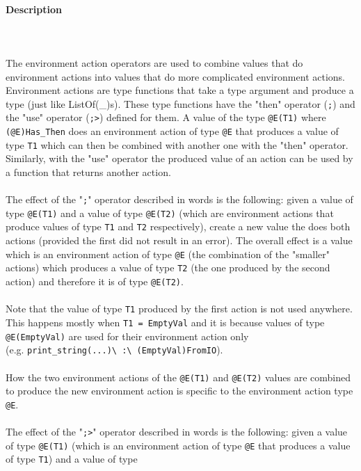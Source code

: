 \documentclass{article}
\begin{document}
\paragraph{Description}
\mbox{} \\\\
The environment action operators are used to combine values that do environment
actions into values that do more complicated environment actions. Environment
actions are type functions that take a type argument and produce a type (just
like ListOf(_)s). These type functions have the "then" operator (\verb|;|)
and the "use" operator (\verb|;>|) defined for them.  A value of the type
\verb|@E(T1)| where \verb|(@E)Has_Then| does an environment action of type
\verb|@E| that produces a value of type \verb|T1| which can then be
combined with another one with the "then" operator. Similarly, with the "use"
operator the produced value of an action can be used by a function that returns
another action.
\\\\
The effect of the "\verb|;|" operator described in words is the following:
given a value of type \verb|@E(T1)| and a value of type \verb|@E(T2)|
(which are environment actions that produce values of type \verb|T1| and
\verb|T2| respectively), create a new value the does both actions (provided
the first did not result in an error).  The overall effect is a value which is
an environment action of type \verb|@E| (the combination of the "smaller"
actions) which produces a value of type \verb|T2| (the one produced by the
second action) and therefore it is of type \verb|@E(T2)|.
\\\\
Note that the value of type \verb|T1| produced by the first action is not
used anywhere. This happens mostly when \verb|T1 = EmptyVal| and it is
because values of type \verb|@E(EmptyVal)| are used for their environment
action only \\(e.g. \verb|print_string(...)\ :\ (EmptyVal)FromIO|).
\\\\
How the two environment actions of the \verb|@E(T1)| and \verb|@E(T2)|
values are combined to produce the new environment action is specific to the
environment action type \verb|@E|.
\\\\
The effect of the "\verb|;>|" operator described in words is the following:
given a value of type \verb|@E(T1)| (which is an environment action of type
\verb|@E| that produces a value of type \verb|T1|) and a value of type
\end{document}
